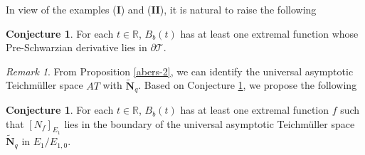 \documentclass[11pt]{amsart}
\theoremstyle{remark}
\newtheorem{remark}[theorem]{Remark}
\theoremstyle{claim}
\theoremstyle{definition}
\theoremstyle{problem}
\theoremstyle{conjecture}
\newtheorem{conjecture}[theorem]{Conjecture}
\theoremstyle{question}
\numberwithin{equation}{section}
\begin{document}
In view of the examples  ($\mathbf{I}$) and  ($\mathbf{II}$),  it is natural to raise the following 
\begin{conjecture}\label{con-1}
For each $t\in \mathbb{R}$, $B_{b}(t)$ has at least one extremal function whose Pre-Schwarzian derivative lies in $\partial \mathcal{T}$.
\end{conjecture}

\begin{remark}
From Proposition \ref{abers-2}, we can identify the universal asymptotic Teichm\"uller space $AT$ with $\widetilde{\mathbf{N}}_q$. Based on Conjecture \ref{con-1}, we propose the following   
\begin{conjecture}\label{con-2}
For each $t\in \mathbb{R}$, $B_{b}(t)$ has at least one extremal function $f$ such that $[N_f]_{E_1}$ lies in the boundary of the universal asymptotic Teichm\"uller space $\widetilde{\mathbf{N}}_q$ in $E_{1}/E_{1,0}$.
\end{conjecture}
\end{remark}
\end{document}
